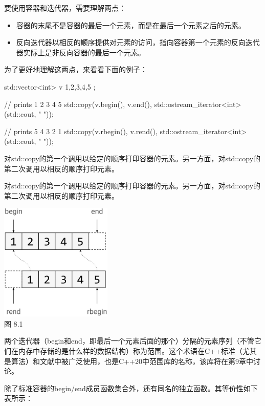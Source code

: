 要使用容器和迭代器，需要理解两点：

\begin{itemize}
  \item
        容器的末尾不是容器的最后一个元素，而是在最后一个元素之后的元素。

  \item
        反向迭代器以相反的顺序提供对元素的访问，指向容器第一个元素的反向迭代器实际上是非反向容器的最后一个元素。
\end{itemize}

为了更好地理解这两点，来看看下面的例子：

\begin{cpp}
std::vector<int> v{ 1,2,3,4,5 };

// prints 1 2 3 4 5
std::copy(v.begin(), v.end(),
		  std::ostream_iterator<int>(std::cout, " "));

// prints 5 4 3 2 1
std::copy(v.rbegin(), v.rend(),
		  std::ostream_iterator<int>(std::cout, " "));
\end{cpp}

对std::copy的第一个调用以给定的顺序打印容器的元素。另一方面，对std::copy的第二次调用以相反的顺序打印元素。

对std::copy的第一个调用以给定的顺序打印容器的元素。另一方面，对std::copy的第二次调用以相反的顺序打印元素。

\begin{center}
  \includegraphics[width=0.4\textwidth]{images/1.png}\\
  图 8.1
\end{center}

两个迭代器（begin和end，即最后一个元素后面的那个）分隔的元素序列（不管它们在内存中存储的是什么样的数据结构）称为范围。这个术语在C++标准（尤其是算法）和文献中被广泛使用，也是C++20中范围库的名称，该库将在第9章中讨论。

除了标准容器的begin/end成员函数集合外，还有同名的独立函数。其等价性如下表所示：

